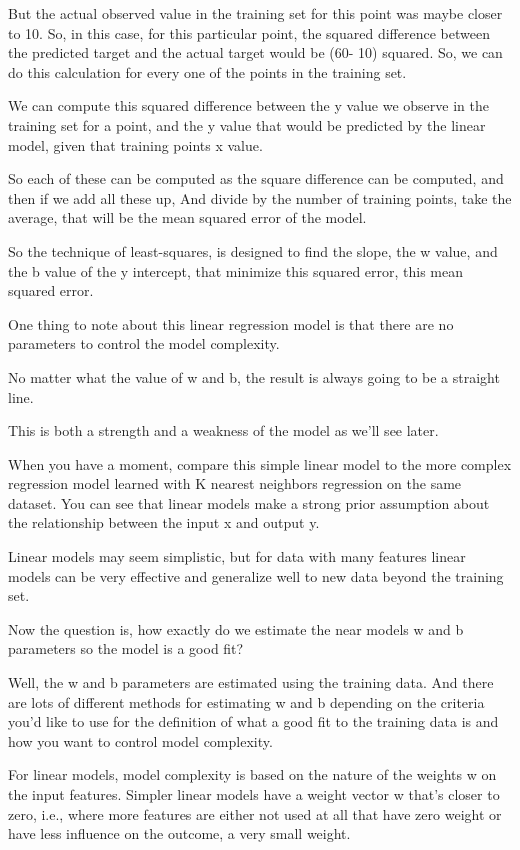 \begin{multicols}{2}
But the actual observed value in the training set for this point was maybe closer to 10. So, in this case, for this particular point, the squared difference between the predicted target and the actual target would be (60- 10) squared. So, we can do this calculation for every one of the points in the training set. 

We can compute this squared difference between the y value we observe in the training set for a point, and the y value that would be predicted by the linear model, given that training points x value. 

So each of these can be computed as the square difference can be computed, and then if we add all these up, And divide by the number of training points, take the average, that will be the mean squared error of the model. 

So the technique of least-squares, is designed to find the slope, the w value, and the b value of the y intercept, that minimize this squared error, this mean squared error. 

One thing to note about this linear regression model is that there are no parameters to control the model complexity. 

No matter what the value of w and b, the result is always going to be a straight line. 

This is both a strength and a weakness of the model as we'll see later. 

When you have a moment, compare this simple linear model to the more complex regression model learned with K nearest neighbors regression on the same dataset. You can see that linear models make a strong prior assumption about the relationship between the input x and output y. 

Linear models may seem simplistic, but for data with many features linear models can be very effective and generalize well to new data beyond the training set. 

Now the question is, how exactly do we estimate the near models w and b parameters so the model is a good fit? 

Well, the w and b parameters are estimated using the training data. And there are lots of different methods for estimating w and b depending on the criteria you'd like to use for the definition of what a good fit to the training data is and how you want to control model complexity. 

For linear models, model complexity is based on the nature of the weights w on the input features. Simpler linear models have a weight vector w that's closer to zero, i.e., where more features are either not used at all that have zero weight or have less influence on the outcome, a very small weight. 


\end{multicols}
